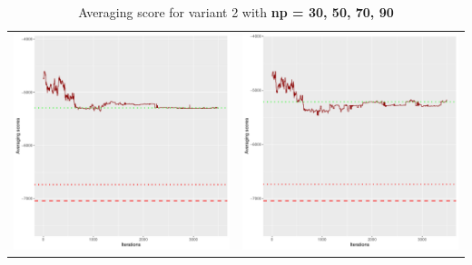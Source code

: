 \documentclass[]{scrartcl}
\begin{document}
\begin{table}[h!]
\begin{tabular}{cc}
\includegraphics[scale = 0.4]{./figs/alarm/v2/70/avgBoundsEvolution-3502.pdf} & 
\includegraphics[scale = 0.4]{./figs/alarm/v2/90/avgBoundsEvolution-3502.pdf} \\
\end{tabular}
\caption{Averaging score for variant 2 with \textbf{np =  30, 50, 70, 90 }}
\end{table}
\end{document}

